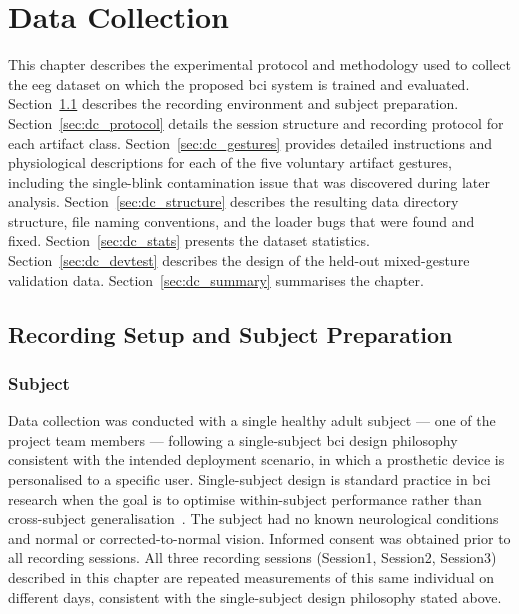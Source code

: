 \chapter{Data Collection}
\label{ch:data_collection}

This chapter describes the experimental protocol and methodology
used to collect the \acrshort{eeg} dataset on which the proposed
\acrshort{bci} system is trained and evaluated.
Section~\ref{sec:dc_setup} describes the recording environment
and subject preparation. Section~\ref{sec:dc_protocol} details
the session structure and recording protocol for each artifact
class. Section~\ref{sec:dc_gestures} provides detailed instructions
and physiological descriptions for each of the five voluntary
artifact gestures, including the single-blink contamination issue
that was discovered during later analysis. Section~\ref{sec:dc_structure}
describes the resulting data directory structure, file naming
conventions, and the loader bugs that were found and fixed.
Section~\ref{sec:dc_stats} presents the dataset statistics.
Section~\ref{sec:dc_devtest} describes the design of the held-out
mixed-gesture validation data. Section~\ref{sec:dc_summary}
summarises the chapter.

\section{Recording Setup and Subject Preparation}
\label{sec:dc_setup}

\subsection{Subject}

Data collection was conducted with a single healthy adult subject
--- one of the project team members --- following a single-subject
\acrshort{bci} design philosophy consistent with the intended
deployment scenario, in which a prosthetic device is personalised
to a specific user. Single-subject design is standard practice
in \acrshort{bci} research when the goal is to optimise
within-subject performance rather than cross-subject
generalisation~\cite{lotte2007review}. The subject had no known
neurological conditions and normal or corrected-to-normal vision.
Informed consent was obtained prior to all recording sessions.
All three recording sessions (Session1, Session2, Session3)
described in this chapter are repeated measurements of this same
individual on different days, consistent with the single-subject
design philosophy stated above.

